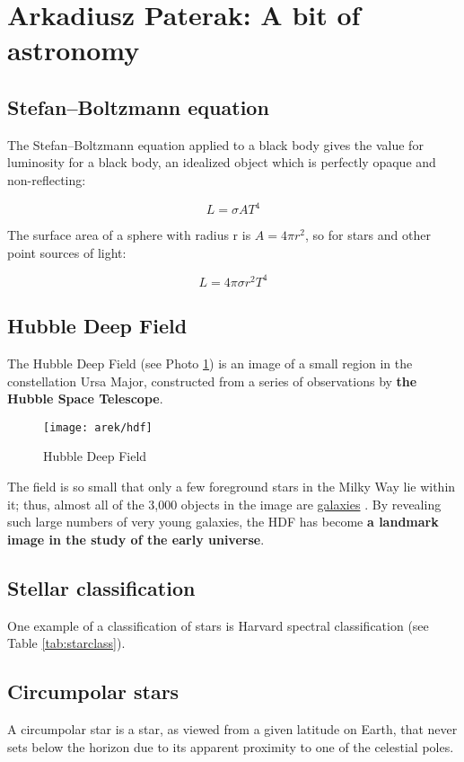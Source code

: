 \renewcommand{\figurename}{Photo}
\renewcommand{\tablename}{Table}
\renewcommand{\labelitemii}{$\star$}

\newpage
\section{Arkadiusz Paterak: A bit of astronomy}
\label{sec:arekpaterak}

\subsection{Stefan–Boltzmann equation}
The Stefan–Boltzmann equation applied to a black body gives the value for luminosity for a black body, an idealized object which is perfectly opaque and non-reflecting: 

\[ L=\sigma AT^4 \]

The surface area of a sphere with radius r is \( A=4\pi r^2 \), so for stars and other point sources of light:

\[ L= 4\pi\sigma r^2T^4 \]

\subsection{Hubble Deep Field}
The Hubble Deep Field (see Photo \ref{fig:deepfield}) is an image of a small region in the constellation Ursa Major, constructed from a series of observations by \textbf{the Hubble Space Telescope}. 

\begin{figure}[H]
\texttt{[image: arek/hdf]}
\centering
\caption{Hubble Deep Field}
\label{fig:deepfield}
\end{figure}

The field is so small that only a few foreground stars in the Milky Way lie within it; thus, almost all of the 3,000 objects in the image are \underline{galaxies} . By revealing such large numbers of very young galaxies, the HDF has become \textbf{a landmark image in the study of the early universe}.


\subsection{Stellar classification}
One example of a classification of stars is Harvard spectral classification (see Table \ref{tab:starclass}).


\subsection{Circumpolar stars}
A circumpolar star is a star, as viewed from a given latitude on Earth, that never sets below the horizon due to its apparent proximity to one of the celestial poles.

